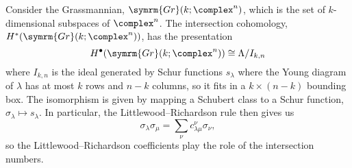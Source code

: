 \documentclass[fleqn]{NotesClass}
\newcommand{\isomorphic}{\cong}
\newcommand{\Gr}{\symrm{Gr}}
\begin{document}
    Consider the Grassmannian, \(\Gr(k; \complex^n)\), which is the set of \(k\)-dimensional subspaces of \(\complex^n\).
    The intersection cohomology, \(H^*(\Gr(k; \complex^n))\), has the presentation
    \begin{equation}
        H^{\bullet}(\Gr(k; \complex^n)) \isomorphic \Lambda / I_{k,n}
    \end{equation}
    where \(I_{k,n}\) is the ideal generated by Schur functions \(s_\lambda\) where the Young diagram of \(\lambda\) has at most \(k\) rows and \(n - k\) columns, so it fits in a \(k \times (n - k)\) bounding box.
    The isomorphism is given by mapping a Schubert class to a Schur function, \(\sigma_\lambda \mapsto s_\lambda\).
    In particular, the Littlewood--Richardson rule then gives us
    \begin{equation}
        \sigma_\lambda \sigma_\mu = \sum_\nu c^\nu_{\lambda\mu} \sigma_\nu,
    \end{equation}
    so the Littlewood--Richardson coefficients play the role of the intersection numbers.
    
	\appendixpage
	\begin{appendices}
	    
	\end{appendices}

    \backmatter
    \renewcommand{\glossaryname}{Acronyms}
    \printglossary[acronym]
    \printindex
\end{document}
